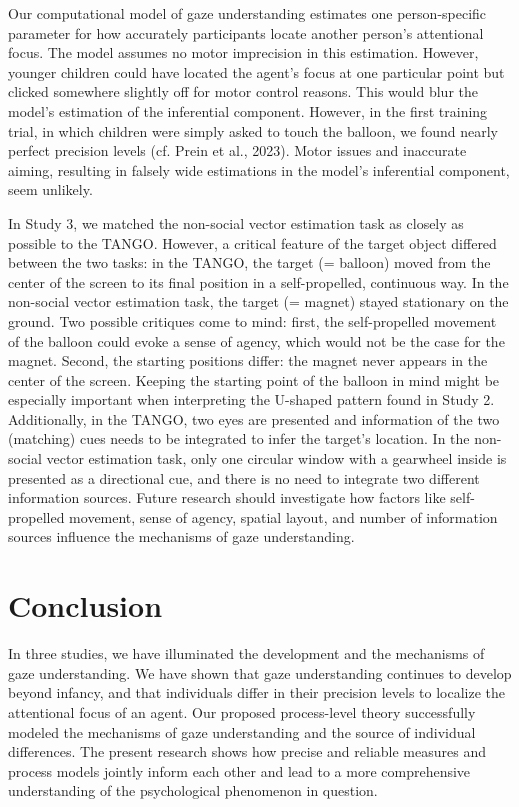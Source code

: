 \documentclass[
  man,mask,floatsintext]{apa7}
\begin{document}
Our computational model of gaze understanding estimates one person-specific parameter for how accurately participants locate another person's attentional focus. The model assumes no motor imprecision in this estimation. However, younger children could have located the agent's focus at one particular point but clicked somewhere slightly off for motor control reasons. This would blur the model's estimation of the inferential component. However, in the first training trial, in which children were simply asked to touch the balloon, we found nearly perfect precision levels (cf. Prein et al., 2023). Motor issues and inaccurate aiming, resulting in falsely wide estimations in the model's inferential component, seem unlikely.

In Study 3, we matched the non-social vector estimation task as closely as possible to the TANGO. However, a critical feature of the target object differed between the two tasks: in the TANGO, the target (= balloon) moved from the center of the screen to its final position in a self-propelled, continuous way. In the non-social vector estimation task, the target (= magnet) stayed stationary on the ground. Two possible critiques come to mind: first, the self-propelled movement of the balloon could evoke a sense of agency, which would not be the case for the magnet. Second, the starting positions differ: the magnet never appears in the center of the screen. Keeping the starting point of the balloon in mind might be especially important when interpreting the U-shaped pattern found in Study 2. Additionally, in the TANGO, two eyes are presented and information of the two (matching) cues needs to be integrated to infer the target's location. In the non-social vector estimation task, only one circular window with a gearwheel inside is presented as a directional cue, and there is no need to integrate two different information sources. Future research should investigate how factors like self-propelled movement, sense of agency, spatial layout, and number of information sources influence the mechanisms of gaze understanding.

\hypertarget{conclusion}{%
\section{Conclusion}\label{conclusion}}

In three studies, we have illuminated the development and the mechanisms of gaze understanding. We have shown that gaze understanding continues to develop beyond infancy, and that individuals differ in their precision levels to localize the attentional focus of an agent. Our proposed process-level theory successfully modeled the mechanisms of gaze understanding and the source of individual differences. The present research shows how precise and reliable measures and process models jointly inform each other and lead to a more comprehensive understanding of the psychological phenomenon in question.
\end{document}
